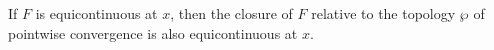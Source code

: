 If $F$ is equicontinuous at $x$, then the closure of $F$ relative to the topology $\wp$ of pointwise convergence is also equicontinuous at $x$.
